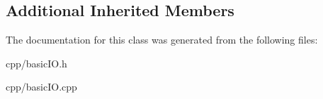 \subsection*{Additional Inherited Members}


The documentation for this class was generated from the following files\+:\begin{DoxyCompactItemize}
\item 
cpp/basic\+I\+O.\+h\item 
cpp/basic\+I\+O.\+cpp\end{DoxyCompactItemize}
